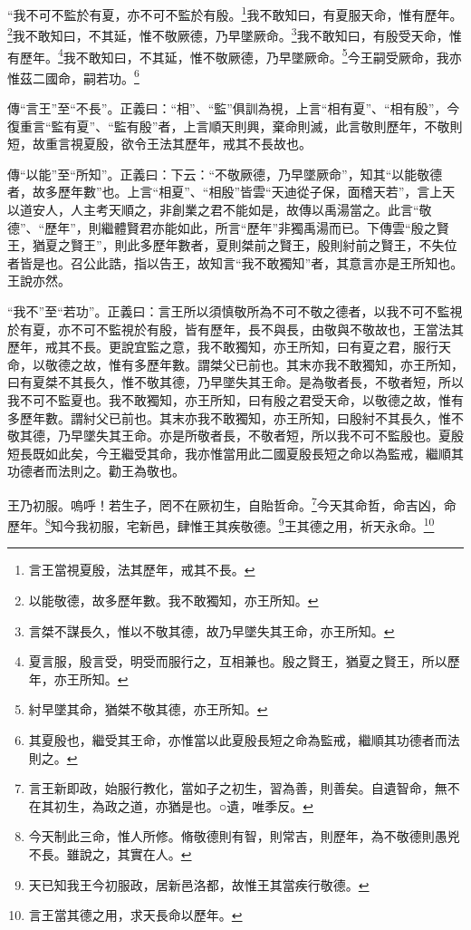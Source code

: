 “我不可不監於有夏，亦不可不監於有殷。\footnote{言王當視夏殷，法其歷年，戒其不長。}我不敢知曰，有夏服天命，惟有歷年。\footnote{以能敬德，故多歷年數。我不敢獨知，亦王所知。}我不敢知曰，不其延，惟不敬厥德，乃早墜厥命。\footnote{言桀不謀長久，惟以不敬其德，故乃早墜失其王命，亦王所知。}我不敢知曰，有殷受天命，惟有歷年。\footnote{夏言服，殷言受，明受而服行之，互相兼也。殷之賢王，猶夏之賢王，所以歷年，亦王所知。}我不敢知曰，不其延，惟不敬厥德，乃早墜厥命。\footnote{紂早墜其命，猶桀不敬其德，亦王所知。}今王嗣受厥命，我亦惟茲二國命，嗣若功。\footnote{其夏殷也，繼受其王命，亦惟當以此夏殷長短之命為監戒，繼順其功德者而法則之。}


{\noindent\zhuan{}\fzbyks 傳“言王”至“不長”。正義曰：“相”、“監”俱訓為視，上言“相有夏”、“相有殷”，今復重言“監有夏”、“監有殷”者，上言順天則興，棄命則滅，此言敬則歷年，不敬則短，故重言視夏殷，欲令王法其歷年，戒其不長故也。 \par}

{\noindent\zhuan{}\fzbyks 傳“以能”至“所知”。正義曰：下云：“不敬厥德，乃早墜厥命”，知其“以能敬德者，故多歷年數”也。上言“相夏”、“相殷”皆雲“天迪從子保，面稽天若”，言上天以道安人，人主考天順之，非創業之君不能如是，故傳以禹湯當之。此言“敬德”、“歷年”，則繼體賢君亦能如此，所言“歷年”非獨禹湯而已。下傳雲“殷之賢王，猶夏之賢王”，則此多歷年數者，夏則桀前之賢王，殷則紂前之賢王，不失位者皆是也。召公此誥，指以告王，故知言“我不敢獨知”者，其意言亦是王所知也。王說亦然。 \par}

{\noindent\shu{}\fzkt “我不”至“若功”。正義曰：言王所以須慎敬所為不可不敬之德者，以我不可不監視於有夏，亦不可不監視於有殷，皆有歷年，長不與長，由敬與不敬故也，王當法其歷年，戒其不長。更說宜監之意，我不敢獨知，亦王所知，曰有夏之君，服行天命，以敬德之故，惟有多歷年數。謂桀父已前也。其末亦我不敢獨知，亦王所知，曰有夏桀不其長久，惟不敬其德，乃早墜失其王命。是為敬者長，不敬者短，所以我不可不監夏也。我不敢獨知，亦王所知，曰有殷之君受天命，以敬德之故，惟有多歷年數。謂紂父已前也。其末亦我不敢獨知，亦王所知，曰殷紂不其長久，惟不敬其德，乃早墜失其王命。亦是所敬者長，不敬者短，所以我不可不監殷也。夏殷短長既如此矣，今王繼受其命，我亦惟當用此二國夏殷長短之命以為監戒，繼順其功德者而法則之。勸王為敬也。 \par}

王乃初服。嗚呼！若生子，罔不在厥初生，自貽哲命。\footnote{言王新即政，始服行教化，當如子之初生，習為善，則善矣。自遺智命，無不在其初生，為政之道，亦猶是也。○遺，唯季反。}今天其命哲，命吉凶，命歷年。\footnote{今天制此三命，惟人所修。脩敬德則有智，則常吉，則歷年，為不敬德則愚兇不長。雖說之，其實在人。}知今我初服，宅新邑，肆惟王其疾敬德。\footnote{天已知我王今初服政，居新邑洛都，故惟王其當疾行敬德。}王其德之用，祈天永命。\footnote{言王當其德之用，求天長命以歷年。}


